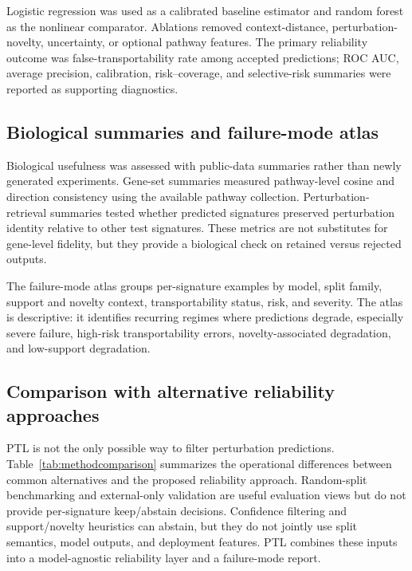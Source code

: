 Logistic regression was used as a calibrated baseline estimator and random forest as the nonlinear comparator. Ablations removed context-distance, perturbation-novelty, uncertainty, or optional pathway features. The primary reliability outcome was false-transportability rate among accepted predictions; ROC AUC, average precision, calibration, risk--coverage, and selective-risk summaries were reported as supporting diagnostics.

\subsection{Biological summaries and failure-mode atlas}

Biological usefulness was assessed with public-data summaries rather than newly generated experiments. Gene-set summaries measured pathway-level cosine and direction consistency using the available pathway collection. Perturbation-retrieval summaries tested whether predicted signatures preserved perturbation identity relative to other test signatures. These metrics are not substitutes for gene-level fidelity, but they provide a biological check on retained versus rejected outputs.

The failure-mode atlas groups per-signature examples by model, split family, support and novelty context, transportability status, risk, and severity. The atlas is descriptive: it identifies recurring regimes where predictions degrade, especially severe failure, high-risk transportability errors, novelty-associated degradation, and low-support degradation.

\subsection{Comparison with alternative reliability approaches}

PTL is not the only possible way to filter perturbation predictions. Table~\ref{tab:methodcomparison} summarizes the operational differences between common alternatives and the proposed reliability approach. Random-split benchmarking and external-only validation are useful evaluation views but do not provide per-signature keep/abstain decisions. Confidence filtering and support/novelty heuristics can abstain, but they do not jointly use split semantics, model outputs, and deployment features. PTL combines these inputs into a model-agnostic reliability layer and a failure-mode report.

\begin{table}[t]
\centering
\caption{Operational comparison between PTL and alternative reliability approaches.}
\label{tab:methodcomparison}
\resizebox{\linewidth}{!}{%

}
\end{table}

